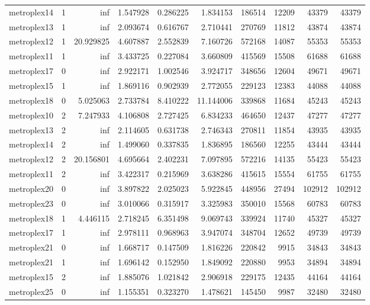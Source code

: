 \documentclass[../../../thesis.tex]{subfiles}
\begin{document}
\begin{longtable}{|l|r|r|r|r|r|r|r|r|r|}
metroplex14 & 1 & inf & 1.547928 & 0.286225 & 1.834153 & 186514 & 12209 & 43379 & 43379 \\
metroplex13 & 1 & inf & 2.093674 & 0.616767 & 2.710441 & 270769 & 11812 & 43874 & 43874 \\
metroplex12 & 1 & 20.929825 & 4.607887 & 2.552839 & 7.160726 & 572168 & 14087 & 55353 & 55353 \\
metroplex11 & 1 & inf & 3.433725 & 0.227084 & 3.660809 & 415569 & 15508 & 61688 & 61688 \\
metroplex17 & 0 & inf & 2.922171 & 1.002546 & 3.924717 & 348656 & 12604 & 49671 & 49671 \\
metroplex15 & 1 & inf & 1.869116 & 0.902939 & 2.772055 & 229123 & 12383 & 44088 & 44088 \\
metroplex18 & 0 & 5.025063 & 2.733784 & 8.410222 & 11.144006 & 339868 & 11684 & 45243 & 45243 \\
metroplex10 & 2 & 7.247933 & 4.106808 & 2.727425 & 6.834233 & 464650 & 12437 & 47277 & 47277 \\
metroplex13 & 2 & inf & 2.114605 & 0.631738 & 2.746343 & 270811 & 11854 & 43935 & 43935 \\
metroplex14 & 2 & inf & 1.499060 & 0.337835 & 1.836895 & 186560 & 12255 & 43444 & 43444 \\
metroplex12 & 2 & 20.156801 & 4.695664 & 2.402231 & 7.097895 & 572216 & 14135 & 55423 & 55423 \\
metroplex11 & 2 & inf & 3.422317 & 0.215969 & 3.638286 & 415615 & 15554 & 61755 & 61755 \\
metroplex20 & 0 & inf & 3.897822 & 2.025023 & 5.922845 & 448956 & 27494 & 102912 & 102912 \\
metroplex23 & 0 & inf & 3.010066 & 0.315917 & 3.325983 & 350010 & 15568 & 60783 & 60783 \\
metroplex18 & 1 & 4.446115 & 2.718245 & 6.351498 & 9.069743 & 339924 & 11740 & 45327 & 45327 \\
metroplex17 & 1 & inf & 2.978111 & 0.968963 & 3.947074 & 348704 & 12652 & 49739 & 49739 \\
metroplex21 & 0 & inf & 1.668717 & 0.147509 & 1.816226 & 220842 & 9915 & 34843 & 34843 \\
metroplex21 & 1 & inf & 1.696142 & 0.152950 & 1.849092 & 220880 & 9953 & 34894 & 34894 \\
metroplex15 & 2 & inf & 1.885076 & 1.021842 & 2.906918 & 229175 & 12435 & 44164 & 44164 \\
metroplex25 & 0 & inf & 1.155351 & 0.323270 & 1.478621 & 145450 & 9987 & 32480 & 32480 \\

\end{longtable}
\end{document}
